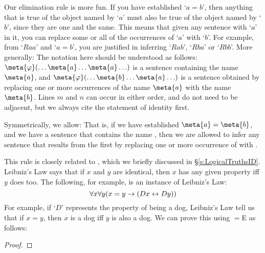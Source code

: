 Our elimination rule is more fun. If you have established `$a=b$', then anything that is true of the object named by `$a$' must also be true of the object named by `$b$', since they are one and the same. This means that given any sentence with `$a$' in it, you can replace some or all of the occurrences of `$a$' with `$b$'. For example, from `$Raa$' and `$a = b$', you are justified in inferring `$Rab$', `$Rba$' or `$Rbb$'. More generally:
The notation here should be understood as follows: $\meta{\varphi}(\ldots \meta{a} \ldots \meta{a}\ldots)$ is a sentence containing the name $\meta{a}$, and $\meta{\varphi}(\ldots \meta{b} \ldots \meta{a}\ldots)$ is a sentence obtained by replacing one or more occurrences of the name $\meta{a}$ with the name $\meta{b}$. Lines $m$ and $n$ can occur in either order, and do not need to be adjacent, but we always cite the statement of identity first.

Symmetrically, we allow:
That is, if we have established $\meta{a} = \meta{b}$, and we have a sentence that contains the name , then we are allowed to infer any sentence that results from the first by replacing one or more occurrence of  with .

This rule is closely related to , which we briefly discussed in \S\ref{s:LogicalTruthsID}. Leibniz's Law says that if $x$ and $y$ are identical, then $x$ has any given property  iff $y$ does too. The following, for example, is an instance of Leibniz's Law:
$$\forall x \forall y (x = y \rightarrow (Dx \leftrightarrow Dy))$$
For example, if `$D$' represents the property of being a dog, Leibniz's Law tell us that if $x=y$, then $x$ is a dog iff $y$ is also a dog.  We can prove this using $=$E as follows:

\begin{proof}
\open
	 \fl{}
	\open
		 \fl{}
		\open
			 
			\open
				 
			\close
			\open
				 
				 
			\close
		 
		\close
	 
	\close
	 
	\close
	 

\end{proof}

